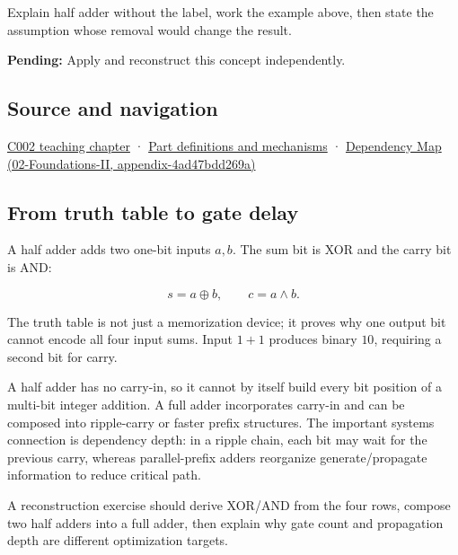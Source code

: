 Explain half adder without the label, work the example above, then state the assumption whose removal would change the result.

\textbf{Pending:} Apply and reconstruct this concept independently.

\subsection{Source and navigation}\label{appendix-1652d27a8e90-source-and-navigation}

\hyperref[01-foundations-i-ch001-arithmetic-becomes-a-policy]{C002 teaching chapter} · \hyperref[appendix-fd090d982a15]{Part definitions and mechanisms} · \href{../02-Foundations-II/main.pdf\#nameddest=appendix-4ad47bdd269a}{Dependency Map (02-Foundations-II, appendix-4ad47bdd269a)}

\subsection{From truth table to gate delay}\label{appendix-1652d27a8e90-from-truth-table-to-gate-delay}

A half adder adds two one-bit inputs \(a,b\). The sum bit is XOR and the carry bit is AND:

\[
s=a\oplus b,\qquad c=a\land b.
\]

The truth table is not just a memorization device; it proves why one output bit cannot encode all four input sums. Input \(1+1\) produces binary \(10\), requiring a second bit for carry.

A half adder has no carry-in, so it cannot by itself build every bit position of a multi-bit integer addition. A full adder incorporates carry-in and can be composed into ripple-carry or faster prefix structures. The important systems connection is dependency depth: in a ripple chain, each bit may wait for the previous carry, whereas parallel-prefix adders reorganize generate/propagate information to reduce critical path.

A reconstruction exercise should derive XOR/AND from the four rows, compose two half adders into a full adder, then explain why gate count and propagation depth are different optimization targets.
